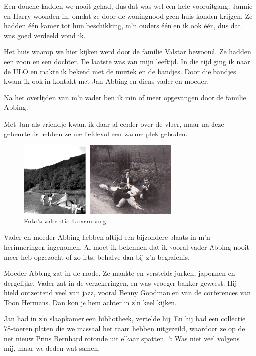 \documentclass[10pt,twoside, openright]{memoir}
\begin{document}
Een douche hadden we nooit gehad, dus dat was wel een hele vooruitgang. Jannie en Harry woonden in, omdat ze door de woningnood geen huis konden krijgen. Ze hadden één kamer tot hun beschikking, m’n ouders één en ik ook één, dus dat was goed verdeeld vond ik. 

Het huis waarop we hier kijken werd door de familie Valstar bewoond. Ze hadden een zoon en een dochter. De laatste was van mijn leeftijd. In die tijd ging ik naar de ULO en raakte ik bekend met de muziek en de bandjes. Door die bandjes kwam ik ook in kontakt met Jan Abbing en diens vader en moeder. 

Na het overlijden van m’n vader ben ik min of meer opgevangen door de familie Abbing. 

Met Jan als vriendje kwam ik daar al eerder over de vloer, maar na deze gebeurtenis hebben ze me liefdevol een warme plek geboden.

\begin{figure}
\includegraphics[width=\textwidth]{img/ch21/luxvak}
\caption*{\footnotesize Foto’s vakantie Luxemburg}
\end{figure}

Vader en moeder Abbing hebben altijd een bijzondere plaats in m’n herinneringen ingenomen. Al moet ik bekennen dat ik vooral vader Abbing nooit meer heb opgezocht of zo iets, behalve dan bij z’n begrafenis. 

Moeder Abbing zat in de mode. Ze maakte en verstelde jurken, japonnen en dergelijke. Vader zat in de verzekeringen, en was vroeger bakker geweest. Hij hield ontzettend veel van jazz, vooral Benny Goodman en van de conferences van Toon Hermans. Dan kon je hem achter in z’n keel kijken. 

Jan had in z’n slaapkamer een bibliotheek, vertelde hij. En hij had een collectie 78-toeren platen die we massaal het raam hebben uitgezeild, waardoor ze op de net nieuw Prins Bernhard rotonde uit elkaar spatten. ’t Was niet veel volgens mij, maar we deden wat samen. 
\end{document}
